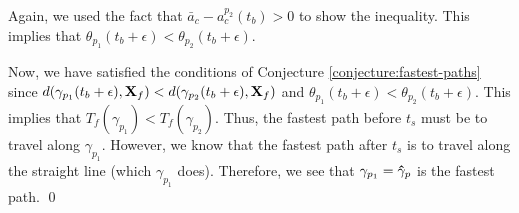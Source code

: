 Again, we used the fact that $\bar{a}_c - a^{p_2}_c(t_b) > 0$ to show the inequality. This implies that $\theta_{p_1}(t_b + \epsilon) < \theta_{p_2}(t_b + \epsilon)$.

Now, we have satisfied the conditions of Conjecture \ref{conjecture:fastest-paths} since $d(\gamma_{p_1}(t_b + \epsilon), \mathbf{X}_f) < d(\gamma_{p_2}(t_b + \epsilon), \mathbf{X}_f)$ and $\theta_{p_1}(t_b + \epsilon) < \theta_{p_2}(t_b + \epsilon)$. This implies that $T_f(\gamma_{p_1}) < T_f(\gamma_{p_2})$. Thus, the fastest path before $t_s$ must be to travel along $\gamma_{p_1}$. However, we know that the fastest path after $t_s$ is to travel along the straight line (which $\gamma_{p_1}$ does). Therefore, we see that $\gamma_{p_1} = \mathbf{\hat{\gamma}}_p$ is the fastest path.
\qed
